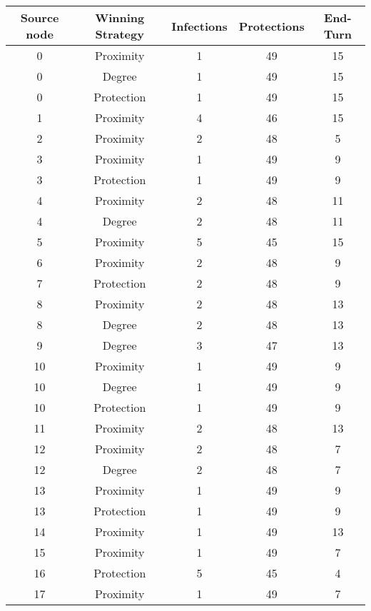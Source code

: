 \documentclass[results.tex]{subfiles}
\begin{document}
\begin{center}
  \begin{tabular}{| c || c | c | c | c |}
    \hline
    {\bfseries Source node} & {\bfseries Winning Strategy} & {\bfseries Infections} & {\bfseries Protections} & {\bfseries End-Turn} \\  %
    \hline\hline
    0 & Proximity & 1 & 49 & 15 \\ 
    \hline
    0 & Degree & 1 & 49 & 15 \\ 
    \hline
    0 & Protection & 1 & 49 & 15 \\ 
    \hline
    1 & Proximity & 4 & 46 & 15 \\ 
    \hline
    2 & Proximity & 2 & 48 & 5 \\ 
    \hline
    3 & Proximity & 1 & 49 & 9 \\ 
    \hline
    3 & Protection & 1 & 49 & 9 \\ 
    \hline
    4 & Proximity & 2 & 48 & 11 \\ 
    \hline
    4 & Degree & 2 & 48 & 11 \\ 
    \hline
    5 & Proximity & 5 & 45 & 15 \\ 
    \hline
    6 & Proximity & 2 & 48 & 9 \\ 
    \hline
    7 & Protection & 2 & 48 & 9 \\ 
    \hline
    8 & Proximity & 2 & 48 & 13 \\ 
    \hline
    8 & Degree & 2 & 48 & 13 \\ 
    \hline
    9 & Degree & 3 & 47 & 13 \\ 
    \hline
    10 & Proximity & 1 & 49 & 9 \\ 
    \hline
    10 & Degree & 1 & 49 & 9 \\ 
    \hline
    10 & Protection & 1 & 49 & 9 \\ 
    \hline
    11 & Proximity & 2 & 48 & 13 \\ 
    \hline
    12 & Proximity & 2 & 48 & 7 \\ 
    \hline
    12 & Degree & 2 & 48 & 7 \\ 
    \hline
    13 & Proximity & 1 & 49 & 9 \\ 
    \hline
    13 & Protection & 1 & 49 & 9 \\ 
    \hline
    14 & Proximity & 1 & 49 & 13 \\ 
    \hline
    15 & Proximity & 1 & 49 & 7 \\ 
    \hline
    16 & Protection & 5 & 45 & 4 \\ 
    \hline
    17 & Proximity & 1 & 49 & 7 \\ 

\end{tabular}
\end{center}
\end{document}
